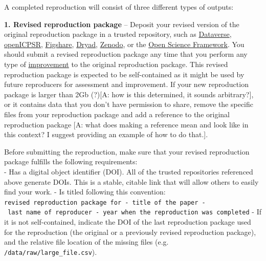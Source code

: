 \documentclass[]{book}
\begin{document}
A completed reproduction will consist of three different types of outputs:

\textbf{1. Revised reproduction package} -- Deposit your revised version of the original reproduction package in a trusted repository, such as \href{https://dataverse.org/}{Dataverse}, \href{https://www.openicpsr.org/openicpsr/}{openICPSR}, \href{https://figshare.com}{Figshare}, \href{https://datadryad.org/stash}{Dryad}, \href{https://about.zenodo.org/}{Zenodo}, or the \href{osf.io/}{Open Science Framework}. You should submit a revised reproduction package any time that you perform any type of \protect\hyperlink{improvements}{improvement} to the original reproduction package. This revised reproduction package is expected to be self-contained as it might be used by future reproducers for assessment and improvement. If your new reproduction package is larger than 2Gb (?){[}A: how is this determined, it sounds arbitrary?{]}, or it contains data that you don't have permission to share, remove the specific files from your reproduction package and add a reference to the original reproduction package {[}A: what does making a reference mean and look like in this context? I suggest providing an example of how to do that.{]}.

Before submitting the reproduction, make sure that your revised reproduction package fulfills the following requirements:\\
- Has a digital object identifier (DOI). All of the trusted repositories referenced above generate DOIs. This is a stable, citable link that will allow others to easily find your work.
- Is titled following this convention: \texttt{revised\ reproduction\ package\ for\ -\ title\ of\ the\ paper\ -\ last\ name\ of\ reproducer\ -\ year\ when\ the\ reproduction\ was\ completed}
- If it is not self-contained, indicate the DOI of the last reproduction package used for the reproduction (the original or a previously revised reproduction package), and the relative file location of the missing files (e.g. \texttt{/data/raw/large\_file.csv}).
\end{document}
